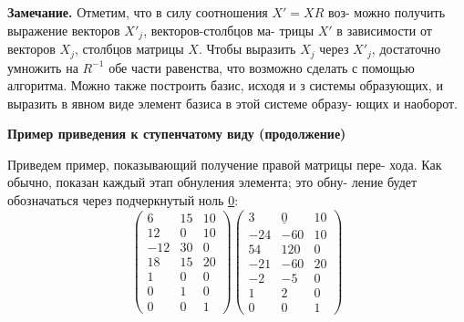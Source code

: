 \documentclass{mai_book}
\begin{document}
	\noindent
	{\small {\bf Замечание.} Отметим, что в силу соотношения $X' = XR$ воз-\linebreak
	можно получить выражение векторов $X'_j$, векторов-столбцов ма-\linebreak
	трицы $X'$ в зависимости от векторов $X_j$, столбцов матрицы $X$.\linebreak
	Чтобы выразить $X_j$ через $X'_j$, достаточно умножить на $R^{-1}$ обе\linebreak
	части равенства, что возможно сделать с помощью алгоритма.\linebreak
	Можно также построить базис, исходя и з системы образующих,\linebreak
	и выразить в явном виде элемент базиса в этой системе образу-\linebreak
	ющих и наоборот.}
	
	\noindent
	{\bf Пример приведения к ступенчатому виду (продолжение)}
	
	Приведем пример, показывающий получение правой матрицы пере-\linebreak
	хода. Как обычно, показан каждый этап обнуления элемента; это обну-\linebreak
	ление будет обозначаться через подчеркнутый ноль \underline{0}:
	$$\begin{pmatrix} 6 & 15 & 10 \\ 12 & 0 & 10 \\ -12 & 30 & 0 \\ 18 & 15 & 20 \\ 1 & 0 & 0 \\ 0 & 1 & 0 \\ 0 & 0 & 1\end{pmatrix}\begin{pmatrix} 3 & \underline{0} & 10 \\ -24 & -60 & 10 \\ 54 & 120 & 0 \\ -21 & -60 & 20 \\ -2 & -5 & 0 \\ 1 & 2 & 0 \\ 0 & 0 & 1\end{pmatrix}$$
	
	\pagebreak
	
	
\end{document}
